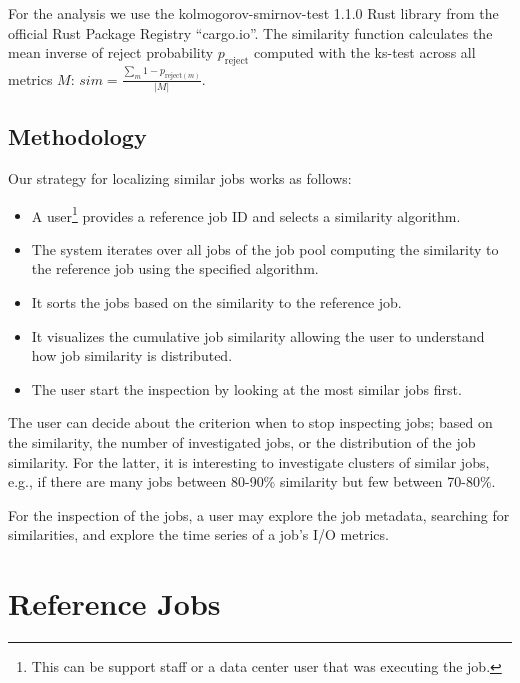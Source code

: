 \documentclass{jhps}
\begin{document}

For the analysis we use the kolmogorov-smirnov-test 1.1.0 Rust library from the official Rust Package Registry ``cargo.io''.
The similarity function calculates the mean inverse of reject probability $p_{\text{reject}}$ computed with the ks-test across all metrics $M$: $sim = \frac{\sum_m 1 - p_{\text{reject}(m)}}{|M|}$.





\subsection{Methodology}
Our strategy for localizing similar jobs works as follows:
\begin{itemize}
  \item A user\footnote{This can be support staff or a data center user that was executing the job.} provides a reference job ID and selects a similarity algorithm.
  \item The system iterates over all jobs of the job pool computing the similarity to the reference job using the specified algorithm.
  \item It sorts the jobs based on the similarity to the reference job.
  \item It visualizes the cumulative job similarity allowing the user to understand how job similarity is distributed.
  \item The user start the inspection by looking at the most similar jobs first.
\end{itemize}
The user can decide about the criterion when to stop inspecting jobs; based on the similarity, the number of investigated jobs, or the distribution of the job similarity.
For the latter, it is interesting to investigate clusters of similar jobs, e.g., if there are many jobs between 80-90\% similarity but few between 70-80\%.

For the inspection of the jobs, a user may explore the job metadata, searching for similarities, and explore the time series of a job's I/O metrics.

\section{Reference Jobs}%
\label{sec:refjobs}
\end{document}
